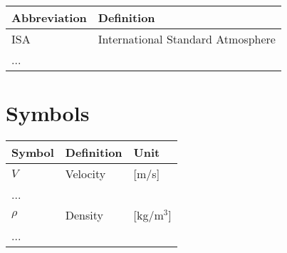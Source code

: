 \begin{longtable}{p{2.5cm}p{8cm}}
    \toprule
    Abbreviation & Definition \\
    \midrule\endhead %
    ISA & International Standard Atmosphere \\
    ... \\
    \bottomrule
\end{longtable}

\section*{Symbols}

\begin{longtable}{p{2.5cm}p{8cm}p{2.5cm}}
    \toprule
    Symbol & Definition & Unit \\
    \midrule\endhead %
    $V$ & Velocity & [m/s] \\
    ... \\
    \midrule %
    $\rho$ & Density & [kg/m$^3$] \\
    ... \\
    \bottomrule
\end{longtable}
